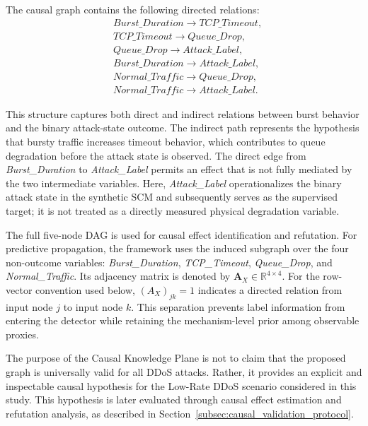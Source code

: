 \documentclass[journal]{IEEEtran}
\begin{document}
The causal graph contains the following directed relations:
\[
  \begin{aligned}
    &\textit{Burst\_Duration} \rightarrow \textit{TCP\_Timeout},\\
    &\textit{TCP\_Timeout} \rightarrow \textit{Queue\_Drop},\\
    &\textit{Queue\_Drop} \rightarrow \textit{Attack\_Label},\\
    &\textit{Burst\_Duration} \rightarrow \textit{Attack\_Label},\\
    &\textit{Normal\_Traffic} \rightarrow \textit{Queue\_Drop},\\
    &\textit{Normal\_Traffic} \rightarrow \textit{Attack\_Label}.
  \end{aligned}
\]

This structure captures both direct and indirect relations between burst
behavior and the binary attack-state outcome. The indirect path represents the
hypothesis that bursty traffic increases timeout behavior, which contributes
to queue degradation before the attack state is observed. The direct edge
from \textit{Burst\_Duration} to \textit{Attack\_Label} permits an effect that
is not fully mediated by the two intermediate variables. Here,
\textit{Attack\_Label} operationalizes the binary attack state in the
synthetic SCM and subsequently serves as the supervised target; it is not
treated as a directly measured physical degradation variable.

The full five-node DAG is used for causal effect identification and
refutation. For predictive propagation, the framework uses the induced
subgraph over the four non-outcome variables: \textit{Burst\_Duration},
\textit{TCP\_Timeout}, \textit{Queue\_Drop}, and
\textit{Normal\_Traffic}. Its adjacency matrix is denoted by
$\mathbf{A}_{X}\in\mathbb{R}^{4\times4}$. For the row-vector convention used
below, $(A_X)_{jk}=1$ indicates a directed relation from input node $j$ to
input node $k$. This separation prevents label information from entering the
detector while retaining the mechanism-level prior among observable proxies.

The purpose of the Causal Knowledge Plane is not to claim that the proposed graph is universally valid for all DDoS attacks. Rather, it provides an explicit and inspectable causal hypothesis for the Low-Rate DDoS scenario considered in this study. This hypothesis is later evaluated through causal effect estimation and refutation analysis, as described in Section~\ref{subsec:causal_validation_protocol}.
\end{document}
